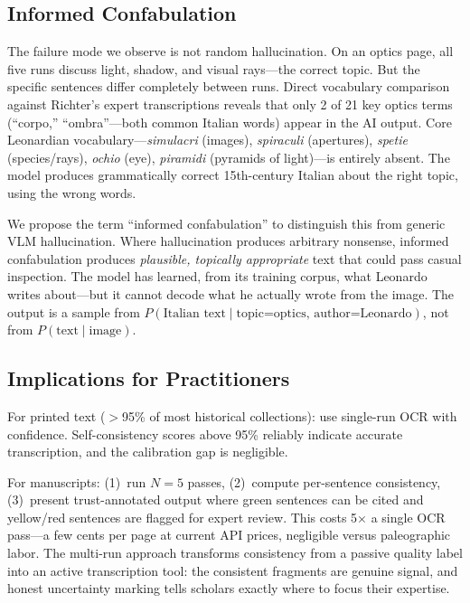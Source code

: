 \documentclass[10pt,twocolumn]{article}
\begin{document}
\subsection{Informed Confabulation}

The failure mode we observe is not random hallucination. On an optics page, all five runs discuss light, shadow, and visual rays---the correct topic. But the specific sentences differ completely between runs. Direct vocabulary comparison against Richter's expert transcriptions reveals that only 2 of 21 key optics terms (``corpo,'' ``ombra''---both common Italian words) appear in the AI output. Core Leonardian vocabulary---\emph{simulacri} (images), \emph{spiraculi} (apertures), \emph{spetie} (species/rays), \emph{ochio} (eye), \emph{piramidi} (pyramids of light)---is entirely absent. The model produces grammatically correct 15th-century Italian about the right topic, using the wrong words.

We propose the term ``informed confabulation'' to distinguish this from generic VLM hallucination. Where hallucination produces arbitrary nonsense, informed confabulation produces \emph{plausible, topically appropriate} text that could pass casual inspection. The model has learned, from its training corpus, what Leonardo writes about---but it cannot decode what he actually wrote from the image. The output is a sample from $P(\text{Italian text} \mid \text{topic=optics, author=Leonardo})$, not from $P(\text{text} \mid \text{image})$.

\subsection{Implications for Practitioners}

For printed text ($>$95\% of most historical collections): use single-run OCR with confidence. Self-consistency scores above 95\% reliably indicate accurate transcription, and the calibration gap is negligible.

For manuscripts: (1)~run $N{=}5$ passes, (2)~compute per-sentence consistency, (3)~present trust-annotated output where green sentences can be cited and yellow/red sentences are flagged for expert review. This costs 5$\times$ a single OCR pass---a few cents per page at current API prices, negligible versus paleographic labor. The multi-run approach transforms consistency from a passive quality label into an active transcription tool: the consistent fragments are genuine signal, and honest uncertainty marking tells scholars exactly where to focus their expertise.
\end{document}

